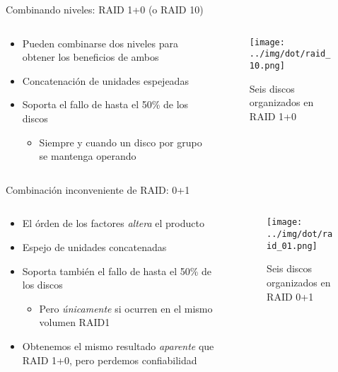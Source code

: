 \documentclass[presentation]{beamer}
\begin{document}
\begin{frame}[label={sec:orge86b5ea}]{Combinando niveles: RAID 1+0 (o RAID 10)}
\begin{columns}\begin{column}{0.6\textwidth}
\begin{itemize}
\item Pueden combinarse dos niveles para obtener los beneficios de ambos
\item Concatenación de unidades espejeadas
\item Soporta el fallo de hasta el 50\% de los discos
\begin{itemize}
\item Siempre y cuando un disco por grupo se mantenga operando
\end{itemize}
\end{itemize}
\end{column} \begin{column}{0.4\textwidth}
\begin{figure}[htbp]
\centering
\texttt{[image: ../img/dot/raid\_10.png]}
\caption{Seis discos organizados en RAID 1+0}
\end{figure}
\end{column}\end{columns}
\end{frame}

\begin{frame}[label={sec:orgbba68ad}]{Combinación inconveniente de RAID: 0+1}
\begin{columns}\begin{column}{0.6\textwidth}
\begin{itemize}
\item El órden de los factores \emph{altera} el producto
\item Espejo de unidades concatenadas
\item Soporta también el fallo de hasta el 50\% de los discos
\begin{itemize}
\item Pero \emph{únicamente} si ocurren en el mismo volumen RAID1
\end{itemize}
\item Obtenemos el mismo resultado \emph{aparente} que RAID 1+0, pero perdemos
confiabilidad
\end{itemize}
\end{column} \begin{column}{0.4\textwidth}
\begin{figure}[htbp]
\centering
\texttt{[image: ../img/dot/raid\_01.png]}
\caption{Seis discos organizados en RAID 0+1}
\end{figure}
\end{column}\end{columns}
\end{frame}
\end{document}

